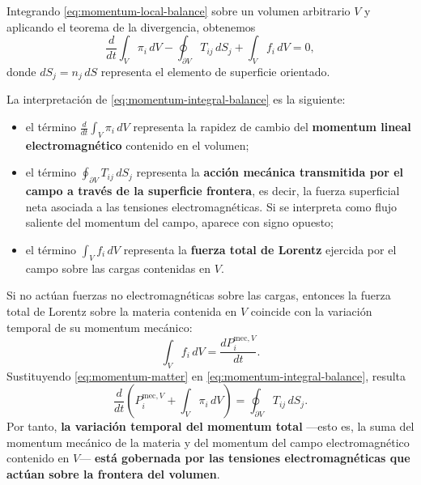 \documentclass[12pt,a4paper]{article}
\theoremstyle{definition}
\theoremstyle{plain}
\numberwithin{equation}{section}
\theoremstyle{remark}
\begin{document}
Integrando \eqref{eq:momentum-local-balance} sobre un volumen arbitrario $V$ y aplicando el teorema de la divergencia, obtenemos
\begin{equation}
    \frac{d}{dt}\int_V \pi_i\,dV
    -
    \oint_{\partial V}T_{ij}\,dS_j
    +
    \int_V f_i\,dV
    =0,
    \label{eq:momentum-integral-balance}
\end{equation}
donde $dS_j=n_j\,dS$ representa el elemento de superficie orientado.

La interpretación de \eqref{eq:momentum-integral-balance} es la siguiente:

\begin{itemize}
    \item el término $\displaystyle \frac{d}{dt}\int_V\pi_i\,dV$ representa la rapidez de cambio del \textbf{momentum lineal electromagnético} contenido en el volumen;
    \item el término $\displaystyle \oint_{\partial V}T_{ij}\,dS_j$ representa la \textbf{acción mecánica transmitida por el campo a través de la superficie frontera}, es decir, la fuerza superficial neta asociada a las tensiones electromagnéticas. Si se interpreta como flujo saliente del momentum del campo, aparece con signo opuesto;
    \item el término $\displaystyle \int_V f_i\,dV$ representa la \textbf{fuerza total de Lorentz} ejercida por el campo sobre las cargas contenidas en $V$.
\end{itemize}

Si no actúan fuerzas no electromagnéticas sobre las cargas, entonces la fuerza total de Lorentz sobre la materia contenida en $V$ coincide con la variación temporal de su momentum mecánico:
\begin{equation}
    \int_V f_i\,dV
    =
    \frac{dP_i^{\mathrm{mec},V}}{dt}.
    \label{eq:momentum-matter}
\end{equation}
Sustituyendo \eqref{eq:momentum-matter} en \eqref{eq:momentum-integral-balance}, resulta
\begin{equation}
    \frac{d}{dt}
    \left(
        P_i^{\mathrm{mec},V}
        +
        \int_V \pi_i\,dV
    \right)
    =
    \oint_{\partial V}T_{ij}\,dS_j.
    \label{eq:total-momentum-balance}
\end{equation}
Por tanto, \textbf{la variación temporal del momentum total} ---esto es, la suma del momentum mecánico de la materia y del momentum del campo electromagnético contenido en $V$--- \textbf{está gobernada por las tensiones electromagnéticas que actúan sobre la frontera del volumen}.
\end{document}
